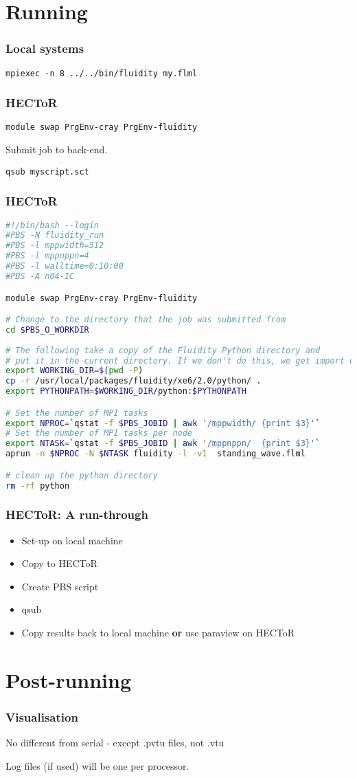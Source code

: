 \documentclass[12pt]{beamer}
\begin{document}
\section{Running}
\begin{frame}
    \frametitle{Local systems}

\texttt{mpiexec -n 8 ../../bin/fluidity my.flml}
\end{frame}

\begin{frame}
    \frametitle{HECToR}

\texttt{module swap PrgEnv-cray PrgEnv-fluidity}
\vspace{5mm}

Submit job to back-end.
\vspace{5mm}

\texttt{qsub myscript.sct}
\end{frame}

\begin{frame}[fragile]
    \frametitle{HECToR}
\vspace{-2mm}
\lstset{language=bash,basicstyle=\tiny}
\begin{lstlisting}[language=bash]
#!/bin/bash --login
#PBS -N fluidity_run
#PBS -l mppwidth=512
#PBS -l mppnppn=4
#PBS -l walltime=0:10:00
#PBS -A n04-IC

module swap PrgEnv-cray PrgEnv-fluidity

# Change to the directory that the job was submitted from
cd $PBS_O_WORKDIR
 
# The following take a copy of the Fluidity Python directory and
# put it in the current directory. If we don't do this, we get import errors. 
export WORKING_DIR=$(pwd -P)
cp -r /usr/local/packages/fluidity/xe6/2.0/python/ .
export PYTHONPATH=$WORKING_DIR/python:$PYTHONPATH

# Set the number of MPI tasks
export NPROC=`qstat -f $PBS_JOBID | awk '/mppwidth/ {print $3}'`
# Set the number of MPI tasks per node
export NTASK=`qstat -f $PBS_JOBID | awk '/mppnppn/  {print $3}'`
aprun -n $NPROC -N $NTASK fluidity -l -v1  standing_wave.flml

# clean up the python directory
rm -rf python
\end{lstlisting}
\end{frame}

\begin{frame}
    \frametitle{HECToR: A run-through}
\begin{itemize}
\item Set-up on local machine
\item Copy to HECToR
\item Create PBS script
\item qsub
\item Copy results back to local machine \textbf{or} use paraview on HECToR
\end{itemize}
\end{frame}


\section{Post-running}
\begin{frame}
    \frametitle{Visualisation}
No different from serial - except .pvtu files, not .vtu
\vspace{5mm}

Log files (if used) will be one per processor.
\end{frame}
\end{document}

